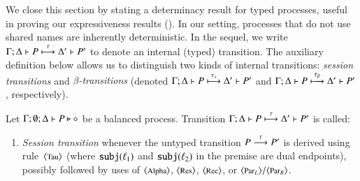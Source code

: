 {%
%
%
%


We close this section by stating  a determinacy result for typed processes, useful in proving our expressiveness results ().
In our setting, processes that do not use shared names are inherently deterministic. 
In the sequel, we write 
 $\Gamma; \Delta \vdash P \stackrel{\tau}{\longmapsto} \Delta' \vdash P'$ to denote an internal (typed) transition.
The auxiliary definition below allows us to distinguish two kinds of  internal transitions:
\emph{session transitions} and \emph{$\beta$-transitions} (denoted 
$\Gamma; \Delta \vdash P \stackrel{\tau_{s}}{\longmapsto} \Delta' \vdash P'$
and $\Gamma; \Delta \vdash P \stackrel{\tau_{\beta}}{\longmapsto} \Delta' \vdash P'$, respectively).

\begin{definition}
\label{def:dettrans}
	Let  $\Gamma; \emptyset; \Delta \vdash P \triangleright \diamond$ be a balanced \HOp process. 
	Transition $\Gamma; \Delta \vdash P \stackrel{\tau}{\longmapsto} \Delta' \vdash P'$ is called:
	\begin{enumerate}[$-$]
		\item	{\em Session transition}
				whenever the untyped transition $P \stackrel{\tau}{\longrightarrow} P'$ 
				is derived using  rule~${\footnotesize \langle \textrm{Tau} \rangle}$ 
				(where $\mathtt{subj}(\ell_1)$ and $\mathtt{subj}(\ell_2)$ in the premise are dual endpoints), 
				possibly followed by uses of
				${\footnotesize \langle \textrm{Alpha} \rangle}$, ${\footnotesize \langle \textrm{Res} \rangle}$, ${\footnotesize \langle \textrm{Rec} \rangle}$, or ${\footnotesize \langle \textrm{Par${}_L$} \rangle}/
				{\footnotesize \langle \textrm{Par${}_R$} \rangle}$.
		

\end{enumerate}
\end{definition}}
